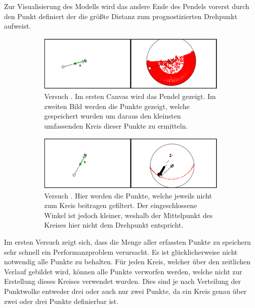 Zur Visualisierung des Modells wird das andere Ende des Pendels vorerst durch den Punkt definiert der die grö{\ss}te Distanz zum prognostizierten Drehpunkt aufweist.

\begin{figure}
    \centering
    \begin{subfigure}[t]{0.45\textwidth}
        \includegraphics[width=\textwidth]{gfx/pendel1_1.png}
        \caption{Versuch . Im ersten Canvas wird das Pendel gezeigt. Im zweiten Bild werden die Punkte gezeigt, welche gespeichert wurden um daraus den kleinsten umfassenden Kreis dieser Punkte zu ermitteln.}\label{fig:pendel1_1}
    \end{subfigure}
    \begin{subfigure}[t]{0.45\textwidth}
        \includegraphics[width=\textwidth]{gfx/pendel1_2.png}
        \caption{Versuch . Hier werden die Punkte, welche jeweils nicht zum Kreis beitragen gefiltert. Der eingeschlossene Winkel ist jedoch kleiner, weshalb der Mittelpunkt des Kreises hier nicht dem Drehpunkt entspricht.}\label{fig:pendel1_2}
    \end{subfigure}
    \caption[Versuche  und ]{}
    \label{fig:pendel1_1_2}
\end{figure}

Im ersten Versuch zeigt sich, dass die Menge aller erfassten Punkte zu speichern sehr schnell ein Performanzproblem verursacht.
Es ist glücklicherweise nicht notwendig alle Punkte zu behalten.
Für jeden Kreis, welcher über den zeitlichen Verlauf gebildet wird, können alle Punkte verworfen werden, welche nicht zur Erstellung dieses Kreises verwendet wurden.
Dies sind je nach Verteilung der Punktwolke entweder drei oder auch nur zwei Punkte, da ein Kreis genau über zwei oder drei Punkte definierbar ist.

